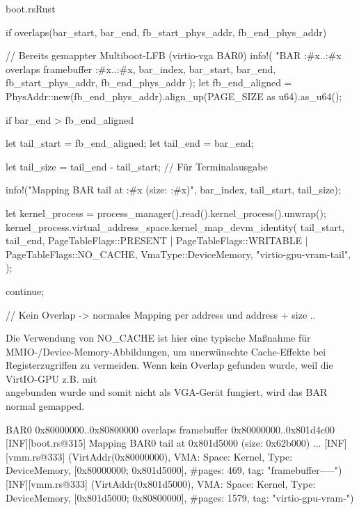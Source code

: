 \begin{codeblock}{boot.rs}{Rust}
  \begin{rustcode}
if overlaps(bar_start, bar_end, fb_start_phys_addr, fb_end_phys_addr) {
    // Bereits gemappter Multiboot-LFB (virtio-vga BAR0) 
    info!(
        "BAR{} {:#x}..{:#x} overlaps framebuffer {:#x}..{:#x},
        bar_index, bar_start, bar_end, fb_start_phys_addr, fb_end_phys_addr
    );
    let fb_end_aligned = PhysAddr::new(fb_end_phys_addr).align_up(PAGE_SIZE as u64).as_u64();

    if bar_end > fb_end_aligned {
        let tail_start = fb_end_aligned;
        let tail_end = bar_end;

        let tail_size = tail_end - tail_start; // Für Terminalausgabe

        info!("Mapping BAR{} tail at {:#x} (size: {:#x})", bar_index, tail_start, tail_size);

        let kernel_process = process_manager().read().kernel_process().unwrap();
        kernel_process.virtual_address_space.kernel_map_devm_identity(
            tail_start,
            tail_end,
            PageTableFlags::PRESENT | PageTableFlags::WRITABLE | PageTableFlags::NO_CACHE,
            VmaType::DeviceMemory,
            "virtio-gpu-vram-tail",
        );
    }
    continue;
}
// Kein Overlap -> normales Mapping per address und address + size
..
  \end{rustcode}
\end{codeblock}

Die Verwendung von NO\_CACHE ist hier eine typische Maßnahme für MMIO-/Device-Memory-Abbildungen, um unerwünschte Cache-Effekte bei Registerzugriffen zu vermeiden. Wenn kein Overlap gefunden wurde, weil die VirtIO-GPU z.B. mit \\  angebunden wurde und somit nicht als VGA-Gerät fungiert, wird das BAR normal gemapped.

\begin{terminalblock}
  \begin{textcode}
[INF][boot.rs@303] BAR0 0x80000000..0x80800000 overlaps framebuffer 0x80000000..0x801d4c00
[INF][boot.rs@315] Mapping BAR0 tail at 0x801d5000 (size: 0x62b000)
...
[INF][vmm.rs@333] (VirtAddr(0x80000000), VMA: Space: Kernel, Type: DeviceMemory, [0x80000000; 0x801d5000], #pages: 469, tag: "framebuffer-----")
[INF][vmm.rs@333] (VirtAddr(0x801d5000), VMA: Space: Kernel, Type: DeviceMemory, [0x801d5000; 0x80800000], #pages: 1579, tag: "virtio-gpu-vram-")
  \end{textcode}
\end{terminalblock}

